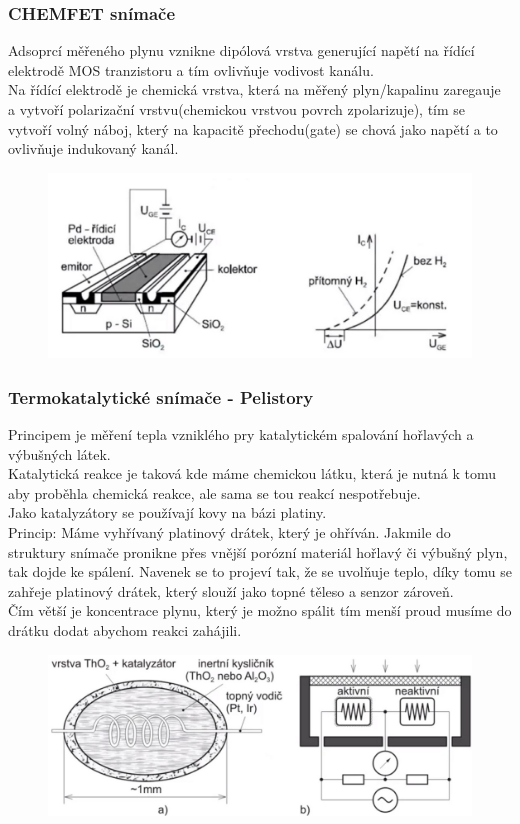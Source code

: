 \subsubsection{CHEMFET snímače}
Adsoprcí měřeného plynu vznikne dipólová vrstva generující napětí na řídící elektrodě MOS tranzistoru a tím ovlivňuje vodivost kanálu.\\
Na řídící elektrodě je chemická vrstva, která na měřený plyn/kapalinu zaregauje a vytvoří polarizační vrstvu(chemickou vrstvou povrch zpolarizuje), tím se vytvoří volný náboj, který na kapacitě přechodu(gate) se chová jako napětí a to ovlivňuje indukovaný kanál.\\
\begin{figure}[h!]
    \centering
    \includegraphics[scale = 0.2]{img/CHEMFET.png}
\end{figure}

\subsubsection{Termokatalytické snímače - Pelistory}
Principem je měření tepla vzniklého pry katalytickém spalování hořlavých a výbušných látek.\\
Katalytická reakce je taková kde máme chemickou látku, která je nutná k tomu aby proběhla chemická reakce, ale sama se tou reakcí nespotřebuje.\\
Jako katalyzátory se používají kovy na bázi platiny.\\
Princip: Máme vyhřívaný platinový drátek, který je ohříván. Jakmile do struktury snímače pronikne přes vnější porózní materiál hořlavý či výbušný plyn, tak dojde ke spálení. Navenek se to projeví tak, že se uvolňuje teplo, díky tomu se zahřeje platinový drátek, který slouží jako topné těleso a senzor zároveň.\\
Čím větší je koncentrace plynu, který je možno spálit tím menší proud musíme do drátku dodat abychom reakci zahájili.\\
\begin{figure}[h!]
    \centering
    \includegraphics[scale = 0.2]{img/Pelistor.png}
\end{figure}

